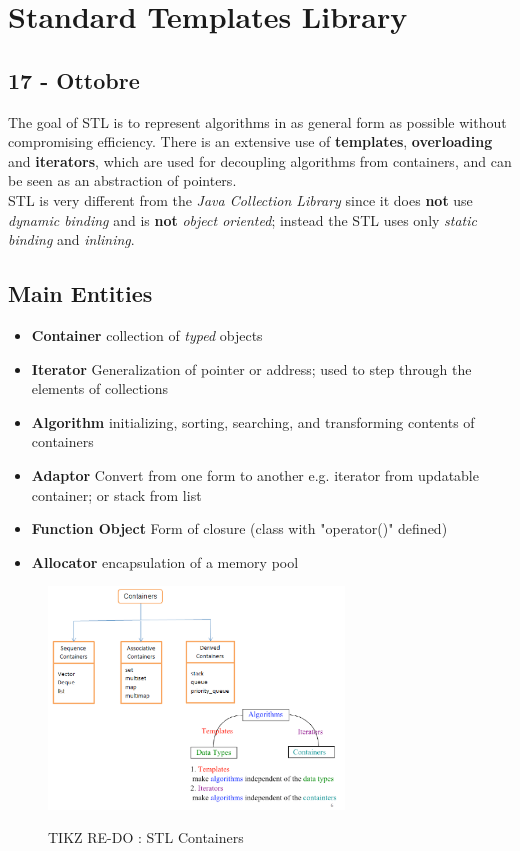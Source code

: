 \chapter{Standard Templates Library}
\section*{17 - Ottobre}
The goal of STL is to represent algorithms in as general form as possible without compromising efficiency.
There is an extensive use of \textbf{templates}, \textbf{overloading} and \textbf{iterators},
which are used for decoupling algorithms from containers,
and can be seen as an abstraction of pointers.\\
STL is very different from the \textit{Java Collection Library} since it does \textbf{not} use \textit{dynamic binding} and is \textbf{not} \textit{object oriented};
instead the STL uses only \textit{static binding} and \textit{inlining}.

\section{Main Entities}
\begin{itemize}
   \item \textbf{Container} collection of \textit{typed} objects
   \item \textbf{Iterator} Generalization of pointer or address;
   used to step through the elements of collections
   \item \textbf{Algorithm} initializing, sorting, searching, and transforming contents of containers
   \item \textbf{Adaptor} Convert from one form to another e.g. iterator from updatable container; or stack from list
   \item \textbf{Function Object} Form of closure (class with "operator()" defined)
   \item \textbf{Allocator} encapsulation of a memory pool
\end{itemize}

\begin{figure}[h]
   \centering
   \includegraphics[width=0.7\textwidth]{images/STL_containers.png}
   \label{fig:STL_containers}
   \caption{TIKZ RE-DO : STL Containers}
\end{figure}

